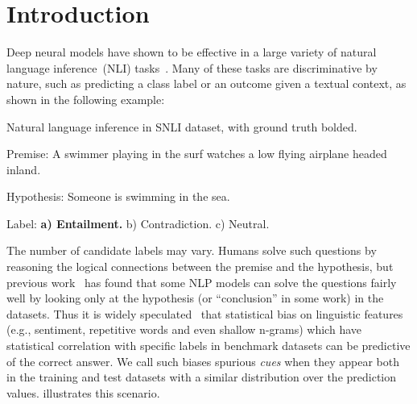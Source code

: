 \section{Introduction}
\label{sec:intro}
Deep neural models have shown to be effective in 
a large variety of natural language inference~(NLI)
tasks~\cite{bowman2015large,wang2018glue,mostafazadeh2016corpus,roemmele2011choice,zellers2018swag}. Many of these tasks
are discriminative by nature, such as predicting a class label or
an outcome given a textual context, as shown in the following example:

\begin{example}\label{exp:snli}
Natural language inference in SNLI dataset, with ground truth bolded.
\begin{description}
\item{Premise:} A swimmer playing in the surf watches a low flying airplane headed inland. 
\item{Hypothesis:} Someone is swimming in the sea.
\item{Label:} \textbf{a) Entailment.} b) Contradiction.  c) Neutral.
\end{description}
\end{example}

The number of candidate labels may vary. Humans solve such questions by
reasoning the logical connections between the premise and the hypothesis,
but previous work~\cite{naik2018stress,schuster2019towards} 
has found that some NLP models can solve the questions
fairly well by looking only at the hypothesis (or ``conclusion'' in some work)
in the datasets.
Thus it is widely speculated~\cite{gururangan2018annotation,sanchez2018behavior,poliak2018hypothesis} 
that statistical bias on linguistic features 
(e.g., sentiment, repetitive words and even shallow n-grams)
which have statistical correlation with specific labels 
in benchmark datasets can be predictive of the correct 
answer. We call such biases spurious \textit{cues} when
they appear both in the training and test datasets with a similar distribution
over the prediction values.   illustrates this
scenario. 


